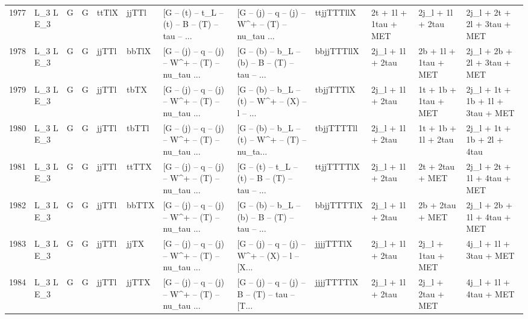 \begin{tabular}{llllllllllll}
1977 &    L\_3 L E\_3 &     G &     G &       ttTlX &       jjTTl &  [G -- (t) -- t\_L -- (t) -- B -- (T) -- tau -- ... &  [G -- (j) -- q -- (j) -- W\textasciicircum + -- (T) -- nu\_tau ... &  ttjjTTTllX &     2t + 1l + 1tau + MET &         2j\_l + 1l + 2tau &        2j\_l + 2t + 2l + 3tau + MET \\
1978 &    L\_3 L E\_3 &     G &     G &       jjTTl &       bbTlX &  [G -- (j) -- q -- (j) -- W\textasciicircum + -- (T) -- nu\_tau ... &  [G -- (b) -- b\_L -- (b) -- B -- (T) -- tau -- ... &  bbjjTTTllX &         2j\_l + 1l + 2tau &     2b + 1l + 1tau + MET &        2j\_l + 2b + 2l + 3tau + MET \\
1979 &    L\_3 L E\_3 &     G &     G &       jjTTl &        tbTX &  [G -- (j) -- q -- (j) -- W\textasciicircum + -- (T) -- nu\_tau ... &  [G -- (b) -- b\_L -- (t) -- W\textasciicircum + -- (X) -- l -- ... &   tbjjTTTlX &         2j\_l + 1l + 2tau &     1t + 1b + 1tau + MET &   2j\_l + 1t + 1b + 1l + 3tau + MET \\
1980 &    L\_3 L E\_3 &     G &     G &       jjTTl &       tbTTl &  [G -- (j) -- q -- (j) -- W\textasciicircum + -- (T) -- nu\_tau ... &  [G -- (b) -- b\_L -- (t) -- W\textasciicircum + -- (T) -- nu\_ta... &  tbjjTTTTll &         2j\_l + 1l + 2tau &      1t + 1b + 1l + 2tau &         2j\_l + 1t + 1b + 2l + 4tau \\
1981 &    L\_3 L E\_3 &     G &     G &       jjTTl &       ttTTX &  [G -- (j) -- q -- (j) -- W\textasciicircum + -- (T) -- nu\_tau ... &  [G -- (t) -- t\_L -- (t) -- B -- (T) -- tau -- ... &  ttjjTTTTlX &         2j\_l + 1l + 2tau &          2t + 2tau + MET &        2j\_l + 2t + 1l + 4tau + MET \\
1982 &    L\_3 L E\_3 &     G &     G &       jjTTl &       bbTTX &  [G -- (j) -- q -- (j) -- W\textasciicircum + -- (T) -- nu\_tau ... &  [G -- (b) -- b\_L -- (b) -- B -- (T) -- tau -- ... &  bbjjTTTTlX &         2j\_l + 1l + 2tau &          2b + 2tau + MET &        2j\_l + 2b + 1l + 4tau + MET \\
1983 &    L\_3 L E\_3 &     G &     G &       jjTTl &        jjTX &  [G -- (j) -- q -- (j) -- W\textasciicircum + -- (T) -- nu\_tau ... &  [G -- (j) -- q -- (j) -- W\textasciicircum + -- (X) -- l -- [X... &   jjjjTTTlX &         2j\_l + 1l + 2tau &        2j\_l + 1tau + MET &             4j\_l + 1l + 3tau + MET \\
1984 &    L\_3 L E\_3 &     G &     G &       jjTTl &       jjTTX &  [G -- (j) -- q -- (j) -- W\textasciicircum + -- (T) -- nu\_tau ... &  [G -- (j) -- q -- (j) -- B -- (T) -- tau -- [T... &  jjjjTTTTlX &         2j\_l + 1l + 2tau &        2j\_l + 2tau + MET &             4j\_l + 1l + 4tau + MET \\

\end{tabular}

